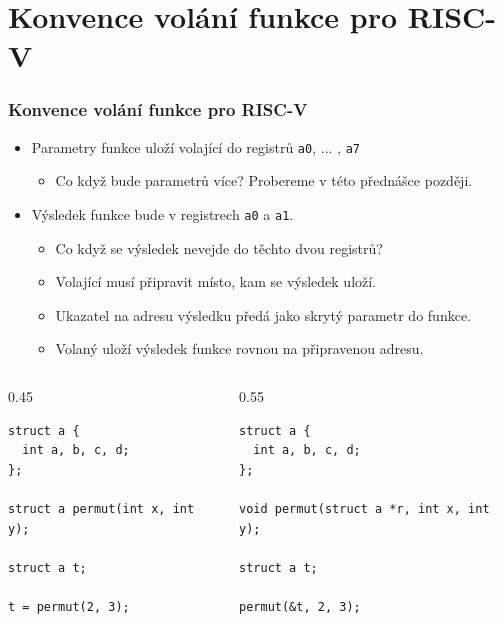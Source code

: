 \documentclass{beamer}
\begin{document}
\section{Konvence volání funkce pro RISC-V}

\begin{frame}[fragile]
\frametitle{Konvence volání funkce pro RISC-V}

\begin{itemize}
 \item Parametry funkce uloží volající do registrů \texttt{a0}, ... , \texttt{a7}
\begin{itemize}
 \item Co když bude parametrů více? Probereme v této přednášce později.
\end{itemize}
 \item Výsledek funkce bude v registrech \texttt{a0} a \texttt{a1}.
\begin{itemize}
 \item Co když se výsledek nevejde do těchto dvou registrů?
 \item Volající musí připravit místo, kam se výsledek uloží.
 \item Ukazatel na adresu výsledku předá jako skrytý parametr do funkce.
 \item Volaný uloží výsledek funkce rovnou na připravenou adresu.
\end{itemize}
\end{itemize}

\begin{columns}
\begin{column}{0.45\textwidth}  
\begin{verbatim}
struct a {
  int a, b, c, d;
};

struct a permut(int x, int y);

struct a t;

t = permut(2, 3);
\end{verbatim}
\end{column}
\begin{column}{0.55\textwidth}  
\begin{verbatim}
struct a {
  int a, b, c, d;
};

void permut(struct a *r, int x, int y);

struct a t;

permut(&t, 2, 3);
\end{verbatim}
\end{column}
\end{columns}
\end{frame}
\end{document}
